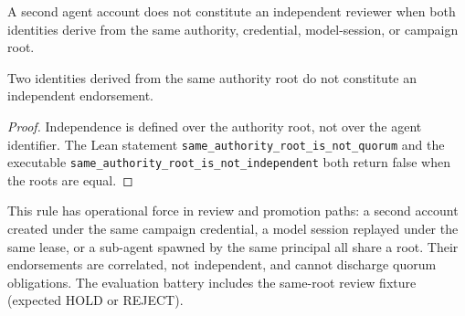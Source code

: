 A second agent account does not constitute an independent reviewer when
both identities derive from the same authority, credential, model-session,
or campaign root.

\begin{theorem}\label{thm:root}
Two identities derived from the same authority root do not constitute an
independent endorsement.
\end{theorem}

\begin{proof}
Independence is defined over the authority root, not over the agent
identifier. The Lean statement
\texttt{same\_authority\_root\_is\_not\_quorum} and the executable
\texttt{same\_authority\_root\_is\_not\_independent} both return false when
the roots are equal.
\end{proof}

This rule has operational force in review and promotion paths: a second
account created under the same campaign credential, a model session
replayed under the same lease, or a sub-agent spawned by the same principal
all share a root. Their endorsements are correlated, not independent, and
cannot discharge quorum obligations. The evaluation battery includes the
same-root review fixture (expected HOLD or REJECT).
